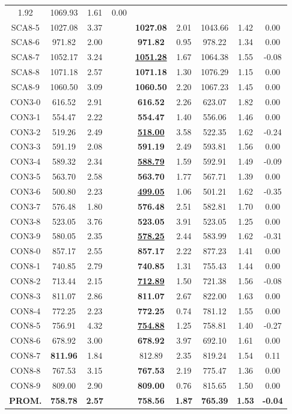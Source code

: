 \begin{table}[h]
\begin{tabular*}{1.00\textwidth}{@{\extracolsep{\fill}} |c||c c||c c c c c c|}
1.92 & 1069.93 & 1.61 & 0.00\\SCA8-5 & 1027.08 & 3.37 & & \bf{1027.08} & 
2.01 & 1043.66 & 1.42 & 0.00\\SCA8-6 & 971.82 & 2.00 & & \bf{971.82} & 
0.95 & 978.22 & 1.34 & 0.00\\SCA8-7 & 1052.17 & 3.24 & & \bf{\underline{1051.28}} & 
1.67 & 1064.38 & 1.55 & -0.08\\SCA8-8 & 1071.18 & 2.57 & & \bf{1071.18} & 
1.30 & 1076.29 & 1.15 & 0.00\\SCA8-9 & 1060.50 & 3.09 & & \bf{1060.50} & 
2.20 & 1067.23 & 1.45 & 0.00\\CON3-0 & 616.52 & 2.91 & & \bf{616.52} & 
2.26 & 623.07 & 1.82 & 0.00\\CON3-1 & 554.47 & 2.22 & & \bf{554.47} & 
1.40 & 556.06 & 1.46 & 0.00\\CON3-2 & 519.26 & 2.49 & & \bf{\underline{518.00}} & 
3.58 & 522.35 & 1.62 & -0.24\\CON3-3 & 591.19 & 2.08 & & \bf{591.19} & 
2.49 & 593.81 & 1.56 & 0.00\\CON3-4 & 589.32 & 2.34 & & \bf{\underline{588.79}} & 
1.59 & 592.91 & 1.49 & -0.09\\CON3-5 & 563.70 & 2.58 & & \bf{563.70} & 
1.77 & 567.71 & 1.39 & 0.00\\CON3-6 & 500.80 & 2.23 & & \bf{\underline{499.05}} & 
1.06 & 501.21 & 1.62 & -0.35\\CON3-7 & 576.48 & 1.80 & & \bf{576.48} & 
2.51 & 582.81 & 1.70 & 0.00\\CON3-8 & 523.05 & 3.76 & & \bf{523.05} & 
3.91 & 523.05 & 1.25 & 0.00\\CON3-9 & 580.05 & 2.35 & & \bf{\underline{578.25}} & 
2.44 & 583.99 & 1.62 & -0.31\\CON8-0 & 857.17 & 2.55 & & \bf{857.17} & 
2.22 & 877.23 & 1.41 & 0.00\\CON8-1 & 740.85 & 2.79 & & \bf{740.85} & 
1.31 & 755.43 & 1.44 & 0.00\\CON8-2 & 713.44 & 2.15 & & \bf{\underline{712.89}} & 
1.50 & 721.38 & 1.56 & -0.08\\CON8-3 & 811.07 & 2.86 & & \bf{811.07} & 
2.67 & 822.00 & 1.63 & 0.00\\CON8-4 & 772.25 & 2.23 & & \bf{772.25} & 
0.74 & 781.12 & 1.55 & 0.00\\CON8-5 & 756.91 & 4.32 & & \bf{\underline{754.88}} & 
1.25 & 758.81 & 1.40 & -0.27\\CON8-6 & 678.92 & 3.00 & & \bf{678.92} & 
3.97 & 692.10 & 1.61 & 0.00\\CON8-7 & \bf{811.96} & 1.84 & & 
812.89 & 2.35 & 819.24 & 1.54 & 0.11\\CON8-8 & 767.53 & 3.15 & & \bf{767.53} & 
2.19 & 775.47 & 1.36 & 0.00\\CON8-9 & 809.00 & 2.90 & & \bf{809.00} & 
0.76 & 815.65 & 1.50 & 0.00\\\hline\hline\bf{PROM.} & 
\bf{758.78} & \bf{2.57} & & \bf{758.56} & \bf{1.87} & \bf{765.39} & \bf{1.53} & \bf{-0.04}\\[1ex]\hline
\end{tabular*}
\label{apendice-tabla-final-gtsD}
\end{table}

